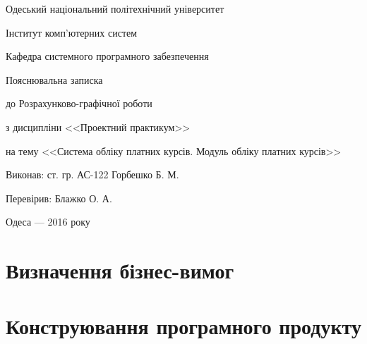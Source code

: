 \documentclass[a4paper,14pt]{article}
\begin{document}

\pagestyle{empty}
\makeatletter
\renewcommand{\@oddfoot}{\raisebox{-1cm}{\parbox[b]{\textwidth}{
\fontsize{10pt}{12pt} \selectfont
Посилання на цей документ: \url{https://github.com/bodqhrohro/knp2014/raw/master/doc/pp_cgw.pdf}
}}}
\makeatother

\begin{center}
Одеський національний політехнічний університет

Інститут комп'ютерних систем

Кафедра системного програмного забезпечення
\vspace{55mm}

Пояснювальна записка

до Розрахунково-графічної роботи

з дисципліни <<Проектний практикум>>

на тему <<Система обліку платних курсів. Модуль обліку платних курсів>>
\end{center}
\vspace{5cm}
\begin{flushright}
Виконав: ст. гр. АС-122 Горбешко Б. М.

Перевірив: Блажко О. А.
\end{flushright}
\vspace{55mm}
\begin{center}Одеса --- 2016 року\end{center}
\newpage
\makeatletter\renewcommand{\@oddhead}{\hfil\thepage}\makeatother

\def\contentsname{ЗМІСТ}
\tableofcontents
\newpage

\section{Визначення бізнес-вимог}



\section{Конструювання програмного продукту}




\end{document}
